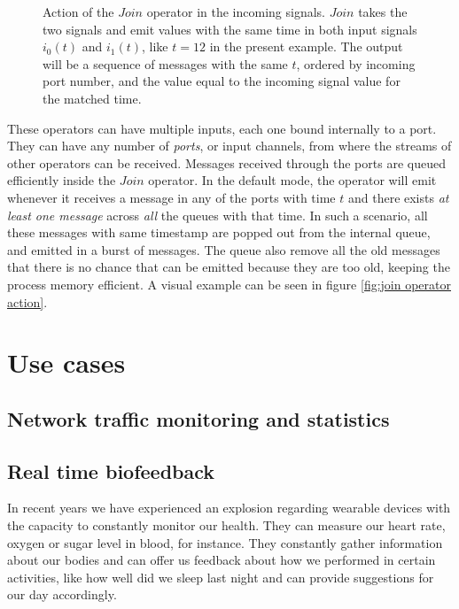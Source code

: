 \documentclass[preprint,1p,times]{elsarticle}
\begin{document}
\begin{figure}[ht]
\begin{center}
    \end{center}
    \caption{Action of the $Join$ operator in the incoming signals. $Join$ takes the two signals and emit 
    values with the same time in both input signals $i_0(t)$ and $i_1(t)$, like $t=12$ in the present example.
    The output will be a sequence of messages with the same $t$, ordered by incoming port number, and the value
    equal to the incoming signal value for the matched time.}
\end{figure}

These operators can have multiple inputs, each one bound internally to a port. They can have any number of \textit{ports}, 
or input channels, from where the streams of other operators can be received. Messages received through the ports 
are queued efficiently inside the $Join$ operator. In the default mode, the operator will emit whenever it receives 
a message in any of the ports with time $t$ and there exists \textit{at least one message} across \textit{all} the queues with that 
time. In such a scenario, all these messages with same timestamp are popped out from the internal queue, and emitted 
in a burst of messages. The queue also remove all the old messages that there is no chance that can be emitted
because they are too old, keeping the process memory efficient. A visual example can be seen in figure \ref{fig:join operator action}.

\section{Use cases}
\subsection{Network traffic monitoring and statistics}
\subsection{Real time biofeedback}

In recent years we have experienced an explosion regarding wearable devices with the capacity to
constantly monitor our health. They can measure our heart rate, oxygen or sugar level in blood,
for instance. They constantly gather information about our bodies and can offer us feedback about
how we performed in certain activities, like how well did we sleep last night and can provide 
suggestions for our day accordingly.
\end{document}
